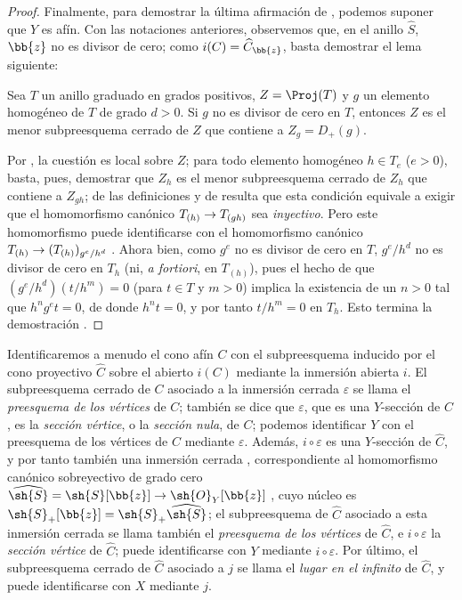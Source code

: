 \documentclass[oneside,10pt]{amsart}
\makeatletter
\newcommand{\ega@arrow}[2]{\mathchoice{#1}{#2}{#2}{#2}}
\renewcommand{\to}{\ega@arrow{\longrightarrow}{\rightarrow}}
\let\EGAOriginalLabel\label
\renewcommand{\label}[1]{\phantomsection\EGAOriginalLabel{#1}}
\makeatother
\begin{document}
\begin{proof}
Finalmente, para demostrar la última afirmación de , podemos suponer que $Y$ es afín.
Con las notaciones anteriores, observemos que, en el anillo $\widehat{S}$, $\bb{z}$ no es divisor de cero;
como $i(C)=\widehat{C}_{\bb{z}}$, basta demostrar el lema siguiente:
\begin{lemma}[8.3.2.7]
\label{II.8.3.2.7}
Sea $T$ un anillo graduado en grados positivos, $Z=\Proj(T)$ y $g$ un elemento homogéneo de $T$ de grado $d>0$.
Si $g$ no es divisor de cero en $T$, entonces $Z$ es el menor subpreesquema cerrado de $Z$ que contiene a $Z_g=D_+(g)$.
\end{lemma}

Por , la cuestión es local sobre $Z$;
para todo elemento homogéneo $h\in T_e$ ($e>0$), basta, pues, demostrar que $Z_h$ es el menor subpreesquema cerrado de $Z_h$ que contiene a $Z_{gh}$;
de las definiciones y de  resulta que esta condición equivale a exigir que el homomorfismo canónico $T_{(h)}\to T_{(gh)}$ sea \emph{inyectivo}.
Pero este homomorfismo puede identificarse con el homomorfismo canónico $T_{(h)}\to(T_{(h)})_{g^e/h^d}$ .
Ahora bien, como $g^e$ no es divisor de cero en $T$, $g^e/h^d$ no es divisor de cero en $T_h$ (ni, \emph{a fortiori}, en $T_{(h)}$), pues el hecho de que $(g^e/h^d)(t/h^m)=0$ (para $t\in T$ y $m>0$) implica la existencia de un $n>0$ tal que $h^ng^et=0$, de donde $h^nt=0$, y por tanto $t/h^m=0$ en $T_h$.
Esto termina la demostración .
\end{proof}
\begin{env}[8.3.3]
\label{II.8.3.3}
Identificaremos a menudo el cono afín $C$ con el subpreesquema inducido por el cono proyectivo $\widehat{C}$ sobre el abierto $i(C)$ mediante la inmersión abierta $i$.
El subpreesquema cerrado de $C$ asociado a la inmersión cerrada $\varepsilon$ se llama el \emph{preesquema de los vértices} de $C$;
también se dice que $\varepsilon$, que es una $Y$-sección de $C$, es la \emph{sección vértice}, o la \emph{sección nula}, de $C$;
podemos identificar $Y$ con el preesquema de los vértices de $C$ mediante $\varepsilon$.
Además, $i\circ\varepsilon$ es una $Y$-sección de $\widehat{C}$, y por tanto también una inmersión cerrada , correspondiente al homomorfismo canónico sobreyectivo de grado cero $\widehat{\sh{S}} = \sh{S}[\bb{z}] \to \sh{O}_Y[\bb{z}]$ , cuyo núcleo es $\sh{S}_+[\bb{z}] = \sh{S}_+\widehat{\sh{S}}$;
el subpreesquema de $\widehat{C}$ asociado a esta inmersión cerrada se llama también el \emph{preesquema de los vértices} de $\widehat{C}$, e $i\circ\varepsilon$ la \emph{sección vértice} de $\widehat{C}$;
puede identificarse con $Y$ mediante $i\circ\varepsilon$.
Por último, el subpreesquema cerrado de $\widehat{C}$ asociado a $j$ se llama el \emph{lugar en el infinito} de $\widehat{C}$, y puede identificarse con $X$ mediante $j$.
\end{env}
\end{document}
